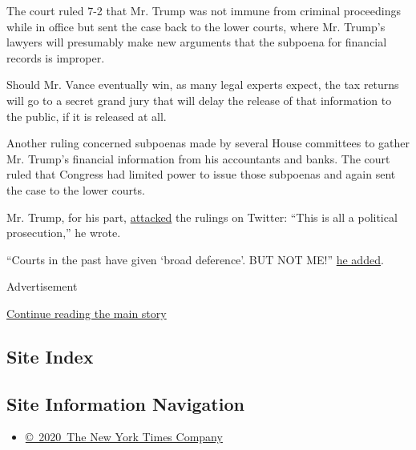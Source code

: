 The court ruled 7-2 that Mr. Trump was not immune from criminal
proceedings while in office but sent the case back to the lower courts,
where Mr. Trump's lawyers will presumably make new arguments that the
subpoena for financial records is improper.

Should Mr. Vance eventually win, as many legal experts expect, the tax
returns will go to a secret grand jury that will delay the release of
that information to the public, if it is released at all.

Another ruling concerned subpoenas made by several House committees to
gather Mr. Trump's financial information from his accountants and banks.
The court ruled that Congress had limited power to issue those subpoenas
and again sent the case to the lower courts.

Mr. Trump, for his part,
\href{https://twitter.com/realDonaldTrump/status/1281236214646034432}{attacked}
the rulings on Twitter: ``This is all a political prosecution,'' he
wrote.

``Courts in the past have given `broad deference'. BUT NOT ME!''
\href{https://twitter.com/realDonaldTrump/status/1281236412667432961}{he
added}.

Advertisement

\protect\hyperlink{after-bottom}{Continue reading the main story}

\hypertarget{site-index}{%
\subsection{Site Index}\label{site-index}}

\hypertarget{site-information-navigation}{%
\subsection{Site Information
Navigation}\label{site-information-navigation}}

\begin{itemize}
\tightlist
\item
  \href{https://help.nytimes3xbfgragh.onion/hc/en-us/articles/115014792127-Copyright-notice}{©~2020~The
  New York Times Company}
\end{itemize}

